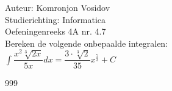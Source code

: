 \documentclass[a4paper]{article}
\newcommand{\dint}{\displaystyle\int}
\begin{document}
	
	\noindent \large Auteur: Komronjon Vosidov \\
	\noindent \large Studierichting: Informatica\\
	\noindent \large Oefeningenreeks 4A nr. 4.7\\
	
	
	\medskip
	\normalsize
	Bereken de volgende onbepaalde integralen:\\
	
$ \dint \dfrac{x^2 \sqrt[3]{2x}}{5x} dx = \dfrac{3 \cdot \sqrt[3]{2}}{35} x^{\tfrac{7}{3}} + C $
	
	
	
	
	
	
	
	\begin{thebibliography}{999}
	\end{thebibliography}		
\end{document}
